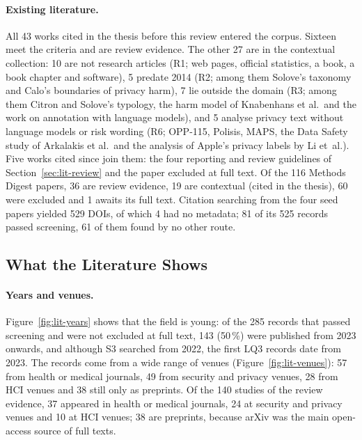 \paragraph{Existing literature.} All 43 works cited in the thesis before this
review entered the corpus. Sixteen meet the criteria and are review evidence.
The other 27 are in the contextual collection: 10 are not research articles
(R1; web pages, official statistics, a book, a book chapter and software), 5
predate 2014 (R2; among them Solove's taxonomy and Calo's boundaries of privacy
harm), 7 lie outside the domain (R3; among them Citron and Solove's typology,
the harm model of Knabenhans et al.\ and the work on annotation with language
models), and 5 analyse privacy text without language models or risk wording
(R6; OPP-115, Polisis, MAPS, the Data Safety study of Arkalakis et al.\ and the
analysis of Apple's privacy labels by Li et~al.). Five works cited since join
them: the four reporting and review guidelines of
Section~\ref{sec:lit-review} and the paper excluded at full text. Of the 116 Methods Digest
papers, 36 are review evidence, 19 are contextual (cited in the thesis), 60
were excluded and 1 awaits its full text. Citation searching from the four seed
papers yielded 529 DOIs, of which 4 had no metadata; 81 of its 525 records
passed screening, 61 of them found by no other route.

\subsection{What the Literature Shows}

\paragraph{Years and venues.} Figure~\ref{fig:lit-years} shows that the field
is young: of the 285 records that passed screening and were not excluded at full
text, 143 (50\,\%) were published from 2023 onwards, and although S3 searched
from 2022, the first LQ3 records date from 2023. The records come from a wide
range of venues
(Figure~\ref{fig:lit-venues}): 57 from health or medical journals, 49 from
security and privacy venues, 28 from HCI venues and 38 still only as
preprints. Of the 140 studies of the review evidence, 37 appeared in health or
medical journals, 24 at security and privacy venues and 10 at HCI venues; 38
are preprints, because arXiv was the main open-access source of full texts.

